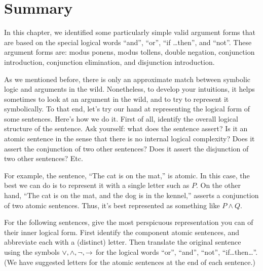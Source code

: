 \section{Summary}

In this chapter, we identified some particularly simple valid argument
forms that are based on the special logical words ``and'', ``or'',
``if \dots then'', and ``not''.  These argument forms are: modus
ponens, modus tollens, double negation, conjunction introduction,
conjunction elimination, and disjunction introduction.


\begin{exercises} As we mentioned before, there is only an approximate
  match between symbolic logic and arguments in the wild.
  Nonetheless, to develop your intuitions, it helps sometimes to look
  at an argument in the wild, and to try to represent it symbolically.
  To that end, let's try our hand at representing the logical form of
  some sentences.  Here's how we do it.  First of all, identify the
  overall logical structure of the sentence.  Ask yourself: what does
  the sentence assert?  Is it an \gls{atomic sentence} in the sense
  that there is no internal logical complexity?  Does it assert the
  conjunction of two other sentences?  Does it assert the disjunction
  of two other sentences?  Etc. 

  For example, the sentence, ``The cat is on the mat,'' is atomic.  In
  this case, the best we can do is to represent it with a single
  letter such as $P$.  On the other hand, ``The cat is on the mat, and
  the dog is in the kennel,'' asserts a conjunction of two atomic
  sentences.  Thus, it's best represented as something like
  $P\wedge Q$.

  For the following sentences, give the most perspicuous
  representation you can of their inner logical form.  First identify
  the component atomic sentences, and abbreviate each with a
  (distinct) letter.  Then translate the original sentence using the
  symbols $\vee ,\wedge ,\neg ,\rightarrow$ for the logical words ``or'',
  ``and'', ``not'', ``if\dots then\dots ''.  (We have suggested
  letters for the atomic sentences at the end of each sentence.)

\begin{enumerate}


\end{enumerate}
\end{exercises}
